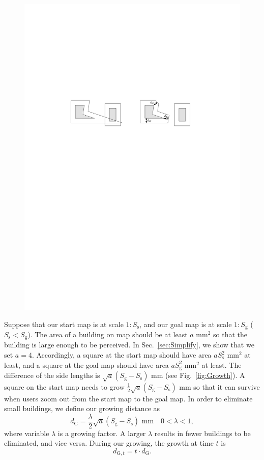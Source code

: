 \documentclass[graybox]{svmult}
\newcommand{\fig}{Fig.~}
\newcommand{\sect}{Sec.~}
\newcommand{\dtrm}[1]{d_{\mathrm{#1},t}}
\begin{document}
\begin{figure}[tb]
	\centering
	\includegraphics{Buffer_MiterLimits}
	\caption{}
	\label{fig:Buffer_MiterLimits}
\end{figure}

Suppose that our start map is at scale $1:S_\mathrm{s}$, 
and our goal map is at scale $1:S_\mathrm{g}$ ($S_\mathrm{s}<S_\mathrm{g}$).
The area of a building on map should be at least $a$ mm$^2$ so that the 
building is large enough to be perceived.
In \sect\ref{sec:Simplify}, we show that we set $a=4$.
Accordingly, a square at the start map should have area $a S_\mathrm{s}^2$ 
mm$^2$ at least, and
a square at the goal map should have area $a S_\mathrm{g}^2$ mm$^2$ at least.
The difference of the side lengths is $\sqrt{a} (S_\mathrm{g}-S_\mathrm{s})$ 
mm (see \fig\ref{fig:Growth}).
A square on the start map needs to grow $\frac{1}{2}\sqrt{a} 
(S_\mathrm{g}-S_\mathrm{s})$ mm so that 
it can survive when users zoom out from 
the start map to the goal map.
In order to eliminate small buildings, 
we define our growing distance as
\begin{equation}
\label{eq:d_G}
d_\mathrm{G}=\frac{\lambda}{2}\sqrt{a} (S_\mathrm{g}-S_\mathrm{s}) \text{ 
	mm} \quad 0 < \lambda <1,
\end{equation}
where variable $\lambda$ is a growing factor. 
A larger $\lambda$ results in  
fewer buildings to be eliminated, and vice versa.
During our growing, the growth at time $t$ is
\begin{equation}
\label{eq:d_Gt}
\dtrm{G} = t \cdot d_\mathrm{G}.
\end{equation}
\end{document}
